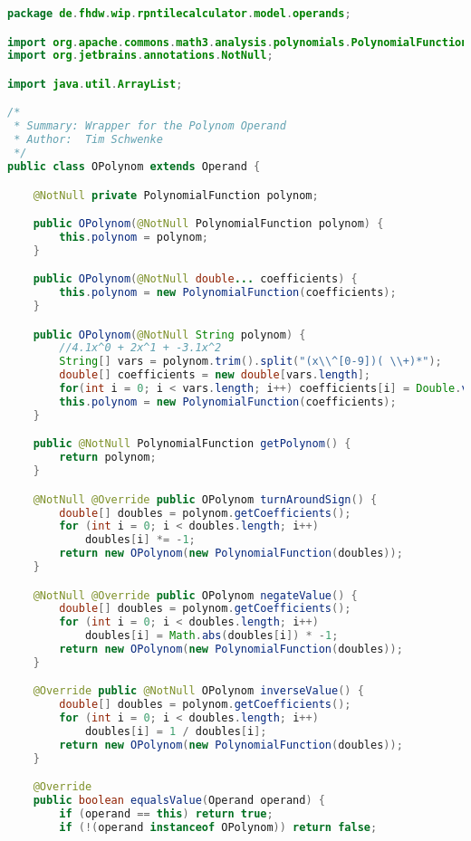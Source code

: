 \begin{lstlisting}[caption=OPolynom (Schwenke),label=list:OPolynom,language=Java]
package de.fhdw.wip.rpntilecalculator.model.operands;

import org.apache.commons.math3.analysis.polynomials.PolynomialFunction;
import org.jetbrains.annotations.NotNull;

import java.util.ArrayList;

/*
 * Summary: Wrapper for the Polynom Operand
 * Author:  Tim Schwenke
 */
public class OPolynom extends Operand {

    @NotNull private PolynomialFunction polynom;

    public OPolynom(@NotNull PolynomialFunction polynom) {
        this.polynom = polynom;
    }

    public OPolynom(@NotNull double... coefficients) {
        this.polynom = new PolynomialFunction(coefficients);
    }

    public OPolynom(@NotNull String polynom) {
        //4.1x^0 + 2x^1 + -3.1x^2
        String[] vars = polynom.trim().split("(x\\^[0-9])( \\+)*");
        double[] coefficients = new double[vars.length];
        for(int i = 0; i < vars.length; i++) coefficients[i] = Double.valueOf(vars[i].trim());
        this.polynom = new PolynomialFunction(coefficients);
    }

    public @NotNull PolynomialFunction getPolynom() {
        return polynom;
    }

    @NotNull @Override public OPolynom turnAroundSign() {
        double[] doubles = polynom.getCoefficients();
        for (int i = 0; i < doubles.length; i++)
            doubles[i] *= -1;
        return new OPolynom(new PolynomialFunction(doubles));
    }

    @NotNull @Override public OPolynom negateValue() {
        double[] doubles = polynom.getCoefficients();
        for (int i = 0; i < doubles.length; i++)
            doubles[i] = Math.abs(doubles[i]) * -1;
        return new OPolynom(new PolynomialFunction(doubles));
    }

    @Override public @NotNull OPolynom inverseValue() {
        double[] doubles = polynom.getCoefficients();
        for (int i = 0; i < doubles.length; i++)
            doubles[i] = 1 / doubles[i];
        return new OPolynom(new PolynomialFunction(doubles));
    }

    @Override
    public boolean equalsValue(Operand operand) {
        if (operand == this) return true;
        if (!(operand instanceof OPolynom)) return false;


\end{lstlisting}
